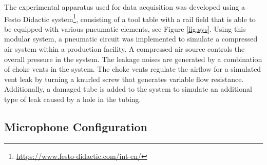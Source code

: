 The experimental apparatus used for data acquisition was developed using a Festo Didactic system\footnote{\url{https://www.festo-didactic.com/int-en/}}, consisting of a tool table with a rail field that is able to be equipped with various pneumatic elements, see Figure \ref{fig:sys}. Using this modular system, a pneumatic circuit was implemented to simulate a compressed air system within a production facility. A compressed air source controls the overall pressure in the system. The leakage noises are generated by a combination of choke vents in the system. The choke vents regulate the airflow for a simulated vent leak by turning a knurled screw that generates variable flow resistance. Additionally, a damaged tube is added to the system to simulate an additional type of leak caused by a hole in the tubing.

\subsection{Microphone Configuration}

